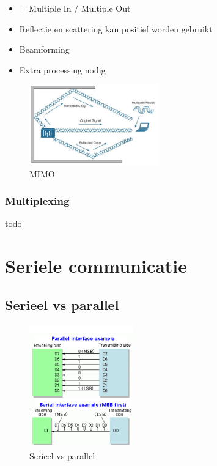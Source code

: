 \documentclass{article}
\begin{document}
\begin{itemize}
    \item = Multiple In / Multiple Out
    \item Reflectie en scattering kan positief worden gebruikt 
    \item Beamforming
    \item Extra processing nodig
\end{itemize}

\begin{figure}[H]
    \centering
    \includegraphics[width=0.5\textwidth]{Screenshot_20200309_125719.png}
    \caption{MIMO}
\end{figure}

\subsubsection{Multiplexing}

todo

\section{Seriele communicatie}
\subsection{Serieel vs parallel}

\begin{figure}[H]
    \centering
    \includegraphics[width=0.4\textwidth]{Screenshot_20200323_114507.png}
    \caption{Serieel vs parallel}
\end{figure}
\end{document}
